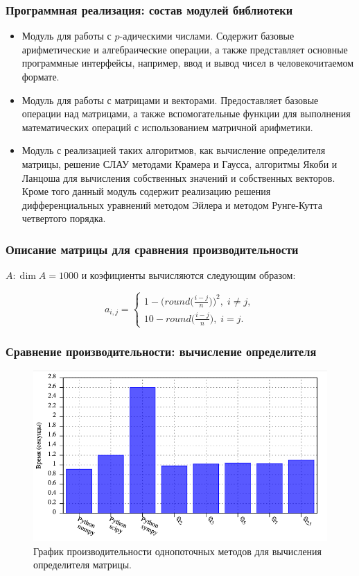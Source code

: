\documentclass[10pt,professionalfont,utf8,presentation,compress]{beamer}
\theoremstyle{definition}
\theoremstyle{plain}
\begin{document}
\begin{frame}
\frametitle{Программная реализация: состав модулей библиотеки}
\begin{itemize}
\item Модуль для работы с $p$-адическими числами. Содержит базовые арифметические и алгебраические операции, а также представляет основные программные интерфейсы, например, ввод и вывод чисел в человекочитаемом формате.
\item Модуль для работы с матрицами и векторами. Предоставляет базовые операции над матрицами, а также вспомогательные функции для выполнения математических операций с использованием матричной арифметики.
\item Модуль с реализацией таких алгоритмов, как вычисление определителя матрицы, решение СЛАУ методами Крамера и Гаусса, алгоритмы Якоби и Ланцоша для вычисления собственных значений и собственных векторов. Кроме того данный модуль содержит реализацию решения дифференциальных уравнений методом Эйлера и методом Рунге-Кутта четвертого порядка.
\end{itemize}
\end{frame}


\begin{frame}
\frametitle{Описание матрицы для сравнения производительности}

$A: \dim{A} = 1000$ и коэфициенты вычисляются следующим образом:

\begin{equation}
a_{i,j}=
\begin{cases}
1-\bigg(round\bigg(\frac{i-j}{n}\bigg)\bigg)^2, \; i \neq j, \\
10-round\bigg(\frac{i-j}{n}\bigg), \; i = j.
\end{cases}
\end{equation}
\end{frame}


\begin{frame}
\frametitle{Сравнение производительности: вычисление определителя}
\begin{figure}[H]
\centerline{\includegraphics[width=0.95\linewidth]{../gnuplot/single/det/plot.png}}
\caption{График производительности однопоточных методов для вычисления определителя матрицы.}
\label{img:single:det:1}
\end{figure}
\end{frame}
\end{document}
